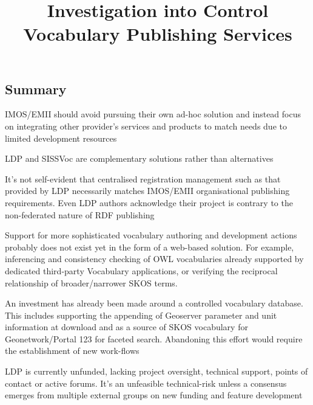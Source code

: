 \documentclass[10pt,a4paper]{article}
\title{Investigation into Control Vocabulary Publishing Services}
\date{}
\newenvironment{italicquotes}
{\begin{quote}\itshape}
{\end{quote}}
\let\Item\item
\newcommand\SpecialItem{\renewcommand\item[1][]{\Item[\textbullet~\bfseries##1]}}
\begin{document}
\SpecialItem

  \maketitle
    \begin{flushleft}



% 
% 



\section{
	Summary
}

\item[] IMOS/EMII should avoid pursuing their own ad-hoc solution and instead focus on integrating other provider's services and products to match needs due to limited development resources
\item[] LDP and SISSVoc are complementary solutions rather than alternatives
\item[] It's not self-evident that centralised registration management such as that provided by LDP necessarily matches IMOS/EMII organisational publishing requirements. Even LDP authors acknowledge their project is contrary to the non-federated nature of RDF publishing
\item[] Support for more sophisticated vocabulary authoring and development actions probably does not exist yet in the form of a web-based solution. For example, inferencing and consistency checking of OWL vocabularies already supported by dedicated third-party Vocabulary applications, or verifying the reciprocal relationship of broader/narrower SKOS terms.
\item[] An investment has already been made around a controlled vocabulary database. This includes supporting the appending of Geoserver parameter and unit information at download and 
as a source of SKOS vocabulary for Geonetwork/Portal 123 for faceted search. Abandoning this effort would require the establishment of new work-flows
\item[] LDP is currently unfunded, lacking project oversight, technical support, points of contact or active forums. It's an unfeasible technical-risk unless a consensus emerges from multiple external groups on new funding and feature development 



\end{flushleft}
\end{document}
